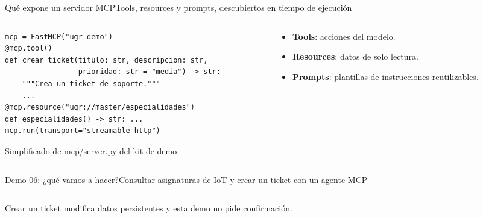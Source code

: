 \begin{frame}[fragile]{Qué expone un servidor MCP}{Tools, resources y prompts, descubiertos en tiempo de ejecución}
	\begin{columns}[T]
		\begin{column}{0.56\textwidth}
			\begin{lstlisting}
mcp = FastMCP("ugr-demo")
@mcp.tool()
def crear_ticket(titulo: str, descripcion: str,
                 prioridad: str = "media") -> str:
    """Crea un ticket de soporte."""
    ...
@mcp.resource("ugr://master/especialidades")
def especialidades() -> str: ...
mcp.run(transport="streamable-http")
\end{lstlisting}
			{\tiny\color{darkgray} Simplificado de mcp/server.py del kit de demo.}
		\end{column}
		\begin{column}{0.4\textwidth}
			\footnotesize
			\begin{itemize}
				\item \textbf{Tools}: acciones del modelo.
				\item \textbf{Resources}: datos de solo lectura.
				\item \textbf{Prompts}: plantillas de instrucciones reutilizables.
			\end{itemize}
		\end{column}
	\end{columns}
\end{frame}

\begin{frame}{Demo 06: ¿qué vamos a hacer?}{Consultar asignaturas de IoT y crear un ticket con un agente MCP}
	\begin{columns}[T]
		\begin{column}{0.31\textwidth}
		\end{column}
		\begin{column}{0.31\textwidth}
		\end{column}
		\begin{column}{0.31\textwidth}
		\end{column}
	\end{columns}
	{\footnotesize Crear un ticket modifica datos persistentes y esta demo no pide confirmación.}
\end{frame}

